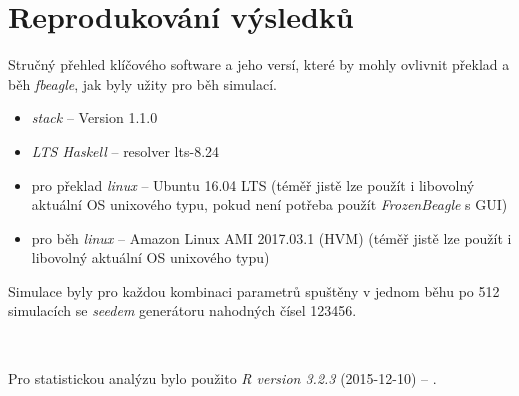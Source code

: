 \section{Reprodukování výsledků}
\label{sec:reproducing}

Stručný přehled klíčového software a jeho versí, které by mohly ovlivnit překlad a běh \textit{fbeagle},
jak byly užity pro běh simulací.

\begin{itemize}
  \item \textit{stack} -- Version 1.1.0
  \item \textit{LTS Haskell} -- resolver lts-8.24
  \item pro překlad \textit{linux} -- Ubuntu 16.04 LTS (téměř jistě lze použít i libovolný aktuální OS unixového typu, pokud není potřeba použít \textit{FrozenBeagle} s GUI)
  \item pro běh \textit{linux} -- Amazon Linux AMI 2017.03.1 (HVM) (téměř jistě lze použít i libovolný aktuální OS unixového typu)
\end{itemize}

Simulace byly pro každou kombinaci parametrů spuštěny v jednom běhu po 512 simulacích se
\textit{seedem} generátoru nahodných čísel 123456.

~

Pro statistickou analýzu bylo použito \textit{R version 3.2.3} (2015-12-10) -- .

